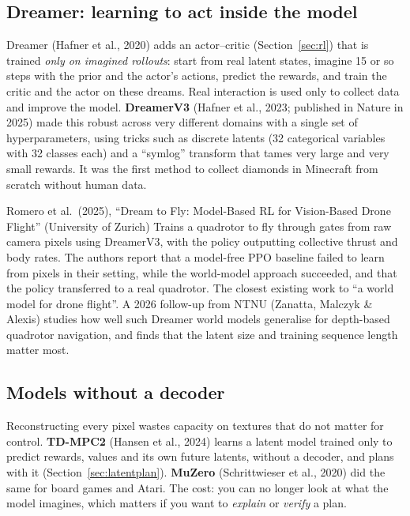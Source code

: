 \subsection{Dreamer: learning to act inside the model}
Dreamer (Hafner et al., 2020) adds an actor--critic (Section~\ref{sec:rl}) that is trained \emph{only on imagined rollouts}: start from real latent states, imagine 15 or so steps with the prior and the actor's actions, predict the rewards, and train the critic and the actor on these dreams. Real interaction is used only to collect data and improve the model. \textbf{DreamerV3} (Hafner et al., 2023; published in Nature in 2025) made this robust across very different domains with a single set of hyperparameters, using tricks such as discrete latents (32 categorical variables with 32 classes each) and a ``symlog'' transform that tames very large and very small rewards. It was the first method to collect diamonds in Minecraft from scratch without human data.

\begin{paperbox}{Romero et al.\ (2025), ``Dream to Fly: Model-Based RL for Vision-Based Drone Flight'' (University of Zurich)}
Trains a quadrotor to fly through gates from raw camera pixels using DreamerV3, with the policy outputting collective thrust and body rates. The authors report that a model-free PPO baseline failed to learn from pixels in their setting, while the world-model approach succeeded, and that the policy transferred to a real quadrotor. The closest existing work to ``a world model for drone flight''. A 2026 follow-up from NTNU (Zanatta, Malczyk \& Alexis) studies how well such Dreamer world models generalise for depth-based quadrotor navigation, and finds that the latent size and training sequence length matter most.
\end{paperbox}

\subsection{Models without a decoder}
Reconstructing every pixel wastes capacity on textures that do not matter for control. \textbf{TD-MPC2} (Hansen et al., 2024) learns a latent model trained only to predict rewards, values and its own future latents, without a decoder, and plans with it (Section~\ref{sec:latentplan}). \textbf{MuZero} (Schrittwieser et al., 2020) did the same for board games and Atari. The cost: you can no longer look at what the model imagines, which matters if you want to \emph{explain} or \emph{verify} a plan.


